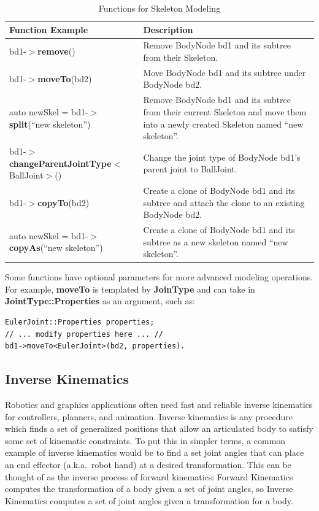 \begin{table}[h]
\centering
\caption{Functions for Skeleton Modeling}
\begin{tabular}{|L{3.3in}|L{2.7in}|}
  \hline
  \textbf{Function Example} & \textbf{Description} \\
  \hline
  bd1-$>$\textbf{remove}() & Remove BodyNode bd1 and its subtree from their Skeleton.  \\
  \hline
   bd1-$>$\textbf{moveTo}(bd2) & Move BodyNode bd1 and its subtree under BodyNode bd2.  \\
  \hline
 auto newSkel = bd1-$>$\textbf{split}(``new skeleton'') & Remove BodyNode bd1 and its subtree from their current Skeleton and move them into a newly created Skeleton named ``new skeleton''.  \\
  \hline
 bd1-$>$\textbf{changeParentJointType}$<$BallJoint$>$() & Change the joint type of BodyNode bd1's parent joint to BallJoint.  \\
  \hline
bd1-$>$\textbf{copyTo}(bd2) & Create a clone of BodyNode bd1 and its subtree
                   and attach the clone to an existing BodyNode bd2. \\
  \hline
 auto newSkel = bd1-$>$\textbf{copyAs}(``new skeleton'') & Create a
                                                         clone of
                                                         BodyNode bd1
                                                         and its
                                                         subtree as a new skeleton named ``new skeleton''.  \\
  \hline
\end{tabular}
\label{tab:skeletonEdit}
\end{table}

Some functions have optional parameters for more advanced modeling
operations. For example, \textbf{moveTo} is templated by \textbf{JoinType} and
can take in \textbf{JointType::Properties} as an argument, such as:
\begin{lstlisting}
EulerJoint::Properties properties;
// ... modify properties here ... //
bd1->moveTo<EulerJoint>(bd2, properties).
\end{lstlisting}

\subsection{Inverse Kinematics}
\label{sec:ik}
Robotics and graphics applications often need fast and reliable inverse kinematics for controllers, planners, and animation. Inverse kinematics is any procedure which finds a set of generalized positions that allow an articulated body to satisfy some set of kinematic constraints. To put this in simpler terms, a common example of inverse kinematics would be to find a set joint angles that can place an end effector (a.k.a.\ robot hand) at a desired transformation. This can be thought of as the inverse process of forward kinematics: Forward Kinematics computes the transformation of a body given a set of joint angles, so Inverse Kinematics computes a set of joint angles given a transformation for a body.

